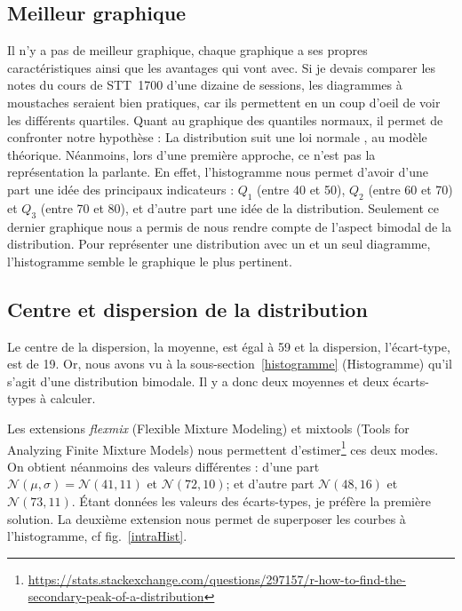 \documentclass[10pt,twocolumn]{article}
\begin{document}
\subsection{Meilleur graphique}
Il n’y a pas de meilleur graphique, chaque graphique a ses propres caractéristiques ainsi que les avantages qui vont avec. Si je devais comparer les notes du cours de STT~1700 d’une dizaine de sessions, les diagrammes à moustaches seraient bien pratiques, car ils permettent en un coup d’oeil de voir les différents quartiles. Quant au graphique des quantiles normaux, il permet de confronter notre hypothèse : \og La distribution suit une loi normale \fg{}, au modèle théorique. Néanmoins, lors d’une première approche, ce n’est pas la représentation la parlante. En effet, l’histogramme nous permet d’avoir d’une part une idée des principaux indicateurs : $Q_{1}$ (entre 40 et 50), $Q_{2}$ (entre 60 et 70) et $Q_{3}$ (entre 70 et 80), et d’autre part une idée de la distribution. Seulement ce dernier graphique nous a permis de nous rendre compte de l’aspect bimodal de la distribution. Pour représenter une distribution avec un et un seul diagramme, l’histogramme semble le graphique le plus pertinent.


\subsection{Centre et dispersion de la distribution}
Le centre de la dispersion, la moyenne, est égal à 59 et la dispersion, l’écart-type, est de 19. Or, nous avons vu à la sous-section~\ref{histogramme} (Histogramme) qu’il s’agit d’une distribution bimodale. Il y a donc deux moyennes et deux écarts-types à calculer.

Les extensions \textit{flexmix} (Flexible Mixture Modeling) et mixtools (Tools for Analyzing Finite Mixture Models) nous permettent d’estimer\footnote{\url{https://stats.stackexchange.com/questions/297157/r-how-to-find-the-secondary-peak-of-a-distribution}} ces deux modes. On obtient néanmoins des valeurs différentes : d’une part $\mathcal{N}(\mu,\sigma) = \mathcal{N}(41,11)$ et $\mathcal{N}(72,10)$; et d’autre part $\mathcal{N}(48,16)$ et $\mathcal{N}(73,11)$. Étant données les valeurs des écarts-types, je préfère la première solution. La deuxième extension nous permet de superposer les courbes à l’histogramme, cf fig.~\ref{intraHist}.
\end{document}
